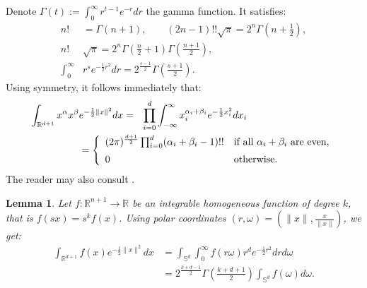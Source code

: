 \documentclass{amsart}
\newcommand{\coloneqq}{:=}
\newcommand{\R}{\mathbb{R}}
\renewcommand{\S}{\mathbb{S}}
\theoremstyle{plain}
\newtheorem{lemma}[theorem]{Lemma}
\theoremstyle{definition}
\theoremstyle{remark}
\begin{document}
Denote $\Gamma(t) \coloneqq \int_{0}^{\infty}r^{t-1}e^{-r}dr$ the gamma function. It satisfies:
\begin{align}
\label{ffgamma}
n!&=\Gamma(n+1),\qquad (2n-1)!!\sqrt{\pi} =2^{n}\Gamma\left(n+\tfrac{1}{2}\right), \\
\label{doublegamma}
n!&\sqrt{\pi}=2^{n}\Gamma\left(\tfrac{n}{2}+1\right)\Gamma\left(\tfrac{n+1}{2}\right) ,\\
\int_0^\infty& r^se^{-\frac{1}{2}r^2} dr = 2^{\frac{s-1}{2}}\Gamma\left(\tfrac{s+1}{2}\right).
\end{align}
Using symmetry, it follows immediately that:
\begin{align}    \label{monoint}
 \int_{\R^{d+1}}x^\alpha x^\beta & e^{-\frac{1}{2}\|x\|^2} dx = \ \ 
\displaystyle \prod_{i=0}^d \int_{-\infty}^\infty x_i^{\alpha_i+\beta_i} e^{-\frac{1}{2}x_i^2} dx_i \\
 &= \left\{
\begin{array}{*2{l}p{5cm}}
(2 \pi)^{\frac{d+1}{2}}\prod_{i=0}^d (\alpha_i+\beta_i-1)!! &\text{if all }\alpha_i+\beta_i\text{ are even}, \vspace{0.2cm} \\ 
 0 &\text{otherwise}.
\end{array}
  \right.\nonumber
\end{align}
The reader may also consult \cite{Folland}.
\begin{lemma}\label{homosphere}
Let $f:\R^{n+1}\rightarrow\R$ be an integrable homogeneous function of degree $k$, that is $f(sx) = s^kf(x)$. Using polar coordinates $(r,\omega) = (\|x\|,\frac{x}{\|x\|})$, we get:
\begin{align*}
\int_{\R^{d+1}}f(x)e^{-\frac{1}{2}\|x\|^2} dx &= \int_{\S^d}\!\int_0^\infty\! f(r\omega) r^d e^{-\frac{1}{2}r^2}dr d\omega \\
&= 2^{\frac{k+d-1}{2}}\Gamma\left(\tfrac{k+d+1}{2}\right)\int_{\S^d}f(\omega)d\omega .
\end{align*}
\end{lemma}
\end{document}
